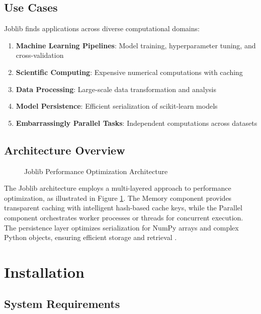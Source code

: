 \subsection{Use Cases}
\label{subsec:usecases}

Joblib finds applications across diverse computational domains:

\begin{enumerate}
	\item \textbf{Machine Learning Pipelines}: Model training, hyperparameter tuning, and cross-validation
	\item \textbf{Scientific Computing}: Expensive numerical computations with caching
	\item \textbf{Data Processing}: Large-scale data transformation and analysis
	\item \textbf{Model Persistence}: Efficient serialization of scikit-learn models
	\item \textbf{Embarrassingly Parallel Tasks}: Independent computations across datasets
\end{enumerate}

\subsection{Architecture Overview}
\label{subsec:architecture}

\begin{figure}[H]
	\centering
	
	\caption{Joblib Performance Optimization Architecture \cite{Joblib:2024}}
	\label{fig:joblib_architecture}
\end{figure}

The Joblib architecture employs a multi-layered approach to performance optimization, as illustrated in Figure \ref{fig:joblib_architecture}. The Memory component provides transparent caching with intelligent hash-based cache keys, while the Parallel component orchestrates worker processes or threads for concurrent execution. The persistence layer optimizes serialization for NumPy arrays and complex Python objects, ensuring efficient storage and retrieval \cite{Joblib:2024}.

\clearpage

\section{Installation}
\label{sec:installation}

\subsection{System Requirements}
\label{subsec:system_requirements}

